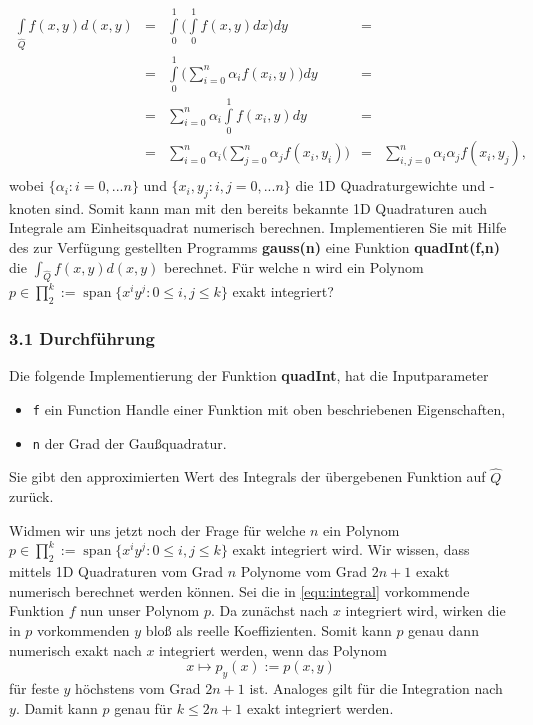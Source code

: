 \documentclass[a4paper,11pt,bibliography=totoc,listof=totoc,headinclude=true,cleardoublepage=empty,oneside]{scrbook}
\newcommand{\code}[1]{\texttt{\color{change}#1}}
\DeclareMathOperator*{\SPAN}{span}
\begin{document}
\begin{equation}\label{equ:integral}
\begin{array}{rccll}
	\int\limits_{\hat{Q}}f(x,y)d(x,y)&=&\int\limits_{0}^{1}\Big(\int\limits_{0}^{1}f(x,y)dx\Big)dy&=&\\
	&=&\int\limits_0^{1}\Big(\sum\limits_{i=0}^n\alpha_i f(x_i,y)\Big)dy &=&\\ 
	&=&\sum\limits_{i=0}^n \alpha_i \int\limits_0^{1} f(x_i,y)dy&=&\\
	&=&\sum\limits_{i=0}^{n} \alpha_i\Big(\sum\limits_{j=0}^{n} \alpha_j f(x_i,y_i)\Big)&=&\sum\limits_{i,j=0}^{n} \alpha_i\alpha_j f(x_i,y_j),\\
\end{array}
\end{equation}
wobei $\{\alpha_i: i=0,...n\}$ und  $\{x_i,y_j : i,j=0,...n\}$ die 1D Quadraturgewichte und -knoten sind. Somit kann man mit den bereits bekannte 1D Quadraturen auch Integrale am Einheitsquadrat numerisch berechnen. Implementieren Sie mit Hilfe des zur Verfügung gestellten Programms \textbf{gauss(n)} eine Funktion \textbf{quadInt(f,n)} die $\int_{\hat{Q}}f(x,y)d(x,y) $ berechnet. Für welche n wird ein Polynom $ p \in \prod_{2}^k:=\SPAN\{x^iy^j:0 \leq i,j\leq k \} $ exakt integriert?

\subsubsection{3.1 Durchführung}

Die folgende Implementierung der Funktion \textbf{quadInt}, hat die Inputparameter
\begin{itemize}
	\item \code{f} ein Function Handle einer Funktion mit oben beschriebenen Eigenschaften,
	\item \code{n} der Grad der Gaußquadratur.
\end{itemize} 
Sie gibt den approximierten Wert des Integrals der übergebenen Funktion auf $\hat{Q}$ zurück.
{
	\color{change}		
 
		
%
}
Widmen wir uns jetzt noch der Frage für welche $n$ ein Polynom $ p \in \prod_{2}^k:=\SPAN\{x^iy^j:0 \leq i,j\leq k \} $ exakt integriert wird.		
Wir wissen, dass mittels 1D Quadraturen vom Grad $n$ Polynome vom Grad $2n+1$ exakt numerisch berechnet werden können. Sei die in \ref{equ:integral} vorkommende Funktion $f$ nun unser Polynom $p$. Da zunächst nach $x$ integriert wird, wirken die in $p$ vorkommenden $y$ bloß als reelle Koeffizienten. Somit kann $p$ genau dann numerisch exakt nach $x$ integriert werden, wenn das Polynom
\begin{equation*}
	x \mapsto p_y(x) := p(x,y)
\end{equation*}
für feste $y$ höchstens vom Grad $2n+1$ ist. Analoges gilt für die Integration nach $y$. Damit kann $p$ genau für $k \leq 2n+1$ exakt integriert werden.
\end{document}
